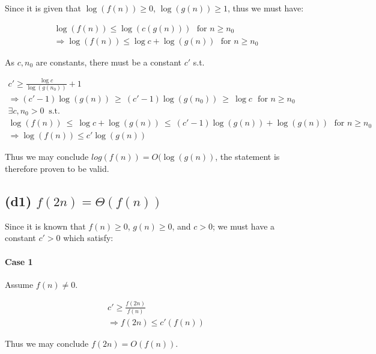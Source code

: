 \documentclass[12pt]{article}
\begin{document}
Since it is given that $\log(f(n))\geq 0$, $\log(g(n)) \geq 1 $, thus we must have:

\begin{gather}
    \log(f(n)) \leq \log(c(g(n))) \ \ \ \text{for $n \geq n_{0}$} \nonumber\\
    \Rightarrow \log(f(n)) \leq \log c + \log(g(n)) \ \ \ \text{for $n \geq n_{0}$}
\end{gather}

As $c, n_{0}$ are constants, there must be a constant $c'$ s.t.


\begin{gather}
    c' \geq \frac{\log c}{\log (g(n_{0}))} + 1 \\
    \Rightarrow (c' -1)\log (g(n))  \ \geq \ (c' -1)\log (g(n_{0})) \ \geq \ \log c \ \ \ \text{for $n \geq n_{0}$} \\
    \exists c, n_{0} > 0 \nonumber \ \text{ s.t. } \  \\
    \log(f(n)) \ \leq \ \log c + \log(g(n)) \ \leq \  (c' -1)\log (g(n)) + \log(g(n))\ \ \ \text{for $n \geq n_{0}$} \\
    \Rightarrow \log(f(n))  \leq c'\log (g(n))
\end{gather}

Thus we may conclude $log(f(n)) = O(\log(g(n))$, the statement is therefore proven to be valid.


\subsection{(d1) $f(2n) = \Theta(f(n))$}

Since it is known that $f(n) \geq 0$, $g(n) \geq 0$, and $c > 0$; we must have a constant $c' > 0$ which satisfy:

\paragraph{Case 1} Assume $f(n) \neq 0$.


\begin{gather}
    c' \geq \frac{f(2n)}{f(n)} \\
    \Rightarrow f(2n) \leq c'(f(n))
\end{gather}

Thus we may conclude $f(2n) = O(f(n))$.
\end{document}
